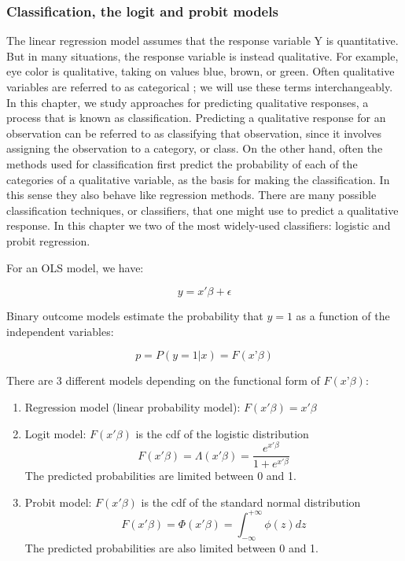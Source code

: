 \subsubsection{Classification, the logit and probit models}
The linear regression model assumes that the response variable Y is quantitative. But in many
situations, the response variable is instead qualitative. For example, eye color is qualitative,
taking on values blue, brown, or green. Often qualitative variables are referred to as categorical ;
we will use these terms interchangeably. In this chapter, we study approaches for predicting
qualitative responses, a process that is known as classification. Predicting a qualitative response
for an observation can be referred to as classifying that observation, since it involves assigning
the observation to a category, or class. On the other hand, often the methods used for
classification first predict the probability of each of the categories of a qualitative variable, as
the basis for making the classification. In this sense they also behave like regression methods.
There are many possible classification techniques, or classifiers, that one might use to predict a
qualitative response. In this chapter we two of the most widely-used classifiers: logistic and
probit regression.

For an OLS model, we have:

\begin{equation}
    y = x'\beta + \epsilon
\end{equation}

Binary outcome models estimate the probability that $y=1$ as a function of the independent
variables:

\begin{equation}
    p = P(y=1 | x) = F(x’\beta)
\end{equation}

There are 3 different models depending on the functional form of $F(x’\beta)$:

\begin{enumerate}
    \item Regression model (linear probability model): $F(x'\beta) = x'\beta$
    \item Logit model: $F(x'\beta)$ is the cdf of the logistic distribution
    \begin{equation}
        F(x'\beta) = \Lambda(x'\beta) = \frac{e^{x'\beta}}{1+e^{x'\beta}}
    \end{equation}
    The predicted probabilities are limited between 0 and 1.
    \item Probit model: $F(x'\beta)$ is the cdf of the standard normal distribution
    \begin{equation}
        F(x'\beta) = \Phi(x'\beta) = \int_{-\infty}^{+\infty} \phi(z)dz
    \end{equation}
    The predicted probabilities are also limited between 0 and 1.
\end{enumerate}

